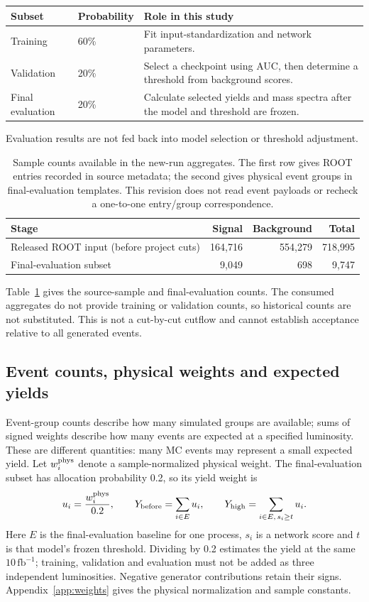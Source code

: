 \documentclass[11pt,a4paper]{article}
\begin{document}
\begin{center}
\small
\begin{tabularx}{\linewidth}{@{}p{.18\linewidth}p{.18\linewidth}Y@{}}
\toprule
Subset & Probability & Role in this study \\
\midrule
Training & 60\% & Fit input-standardization and network parameters. \\
Validation & 20\% & Select a checkpoint using AUC, then determine a threshold from background scores. \\
Final evaluation & 20\% & Calculate selected yields and mass spectra after the model and threshold are frozen. \\
\bottomrule
\end{tabularx}
\end{center}
Evaluation results are not fed back into model selection or threshold adjustment.
\begin{table}[H]
\caption{Sample counts available in the new-run aggregates. The first row gives ROOT entries recorded in source metadata; the second gives physical event groups in final-evaluation templates. This revision does not read event payloads or recheck a one-to-one entry/group correspondence.}
\label{tab:population}
\centering
\small
\begin{tabular}{lrrr}
\toprule
Stage & Signal & Background & Total \\
\midrule
Released ROOT input (before project cuts) & 164,716 & 554,279 & 718,995 \\
Final-evaluation subset & 9,049 & 698 & 9,747 \\
\bottomrule
\end{tabular}
\end{table}
Table~\ref{tab:population} gives the source-sample and final-evaluation counts.
The consumed aggregates do not provide training or validation counts, so historical counts are not substituted.
This is not a cut-by-cut cutflow and cannot establish acceptance relative to all generated events.

\subsection{Event counts, physical weights and expected yields}\label{sec:weights}
Event-group counts describe how many simulated groups are available; sums of signed weights describe how many events are expected at a specified luminosity.
These are different quantities: many MC events may represent a small expected yield.
Let $w_i^{\rm phys}$ denote a sample-normalized physical weight. The final-evaluation subset has allocation probability 0.2, so its yield weight is
\[
 u_i=\frac{w_i^{\rm phys}}{0.2},\qquad
 Y_{\rm before}=\sum_{i\in E}u_i,\qquad
 Y_{\rm high}=\sum_{i\in E,\,s_i\geq t}u_i.
\]
Here $E$ is the final-evaluation baseline for one process, $s_i$ is a network score and $t$ is that model's frozen threshold.
Dividing by 0.2 estimates the yield at the same $10\,\mathrm{fb}^{-1}$; training, validation and evaluation must not be added as three independent luminosities.
Negative generator contributions retain their signs. Appendix~\ref{app:weights} gives the physical normalization and sample constants.
\FloatBarrier
\end{document}
